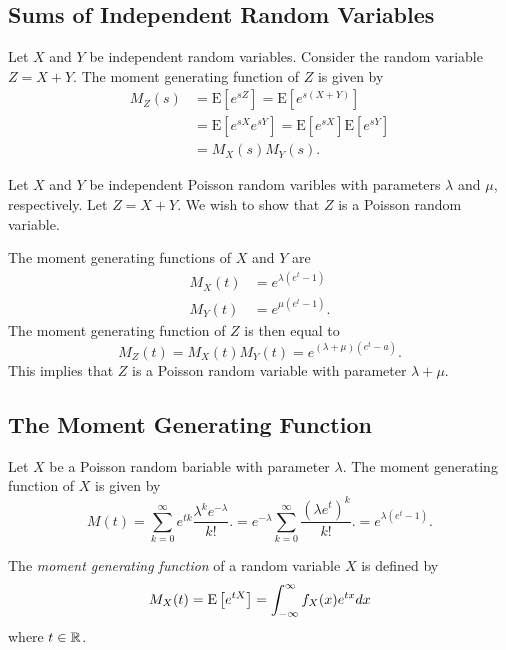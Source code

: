 \subsection{Sums of Independent Random Variables}

Let $X$ and $Y$ be independent random variables.
Consider the random variable $Z = X + Y$.
The moment generating function of $Z$ is given by
\begin{equation*}
\begin{split}
M_Z (s) &= \mathrm{E} \left[ e^{sZ} \right]
= \mathrm{E} \left[ e^{s(X + Y)} \right] \\
&= \mathrm{E} \left[ e^{sX} e^{sY} \right]
= \mathrm{E} \left[ e^{sX} \right] \mathrm{E} \left[ e^{sY} \right] \\
&= M_X(s) M_Y(s) .
\end{split}
\end{equation*}

\begin{example}
Let $X$ and $Y$ be independent Poisson random varibles with parameters $\lambda$ and $\mu$, respectively.
Let $Z = X + Y$.
We wish to show that $Z$ is a Poisson random variable.

The moment generating functions of $X$ and $Y$ are
\begin{align*}
M_X (t) &= e^{\lambda ( e^t -1)} \\
M_Y (t) &= e^{\mu ( e^t -1)} .
\end{align*}
The moment generating function of $Z$ is then equal to
\begin{equation*}
M_Z (t) = M_X (t) M_Y (t) = e^{(\lambda + \mu) (e^t - a)} .
\end{equation*}
This implies that $Z$ is a Poisson random variable with parameter $\lambda + \mu$.
\end{example}


\subsection{The Moment Generating Function}


\begin{example}
Let $X$ be a Poisson random bariable with parameter $\lambda$.
The moment generating function of $X$ is given by
\begin{equation*}
M(t) = \sum_{k=0}^{\infty} e^{tk} \frac{ \lambda^k e^{-\lambda}}{k!} .
= e^{-\lambda} \sum_{k=0}^{\infty} \frac{\left( \lambda e^t \right)^k}{k!} .
= e^{\lambda(e^t -1)} .
\end{equation*}

\end{example}
The \emph{moment generating function} of a random variable $X$ is defined by
\begin{equation*}
M_X (t) = \mathrm{E} \left[ e^{t X} \right]
= \int_{-\infty}^{\infty} f_X (x) e^{t x} dx
\end{equation*}
where $t \in \mathbb{R}$.



